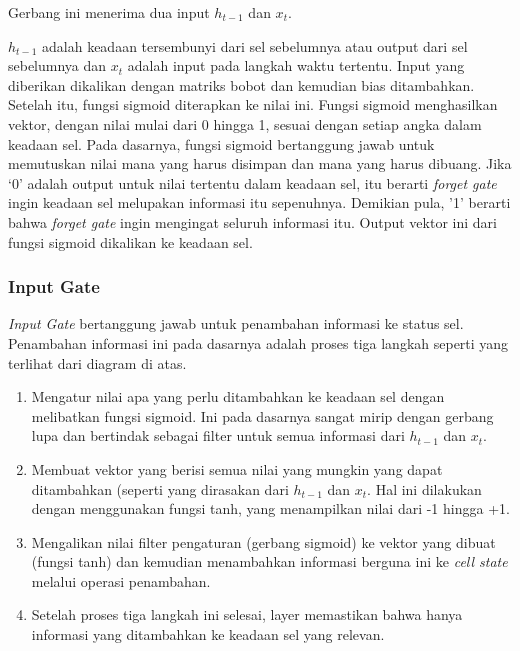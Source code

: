 \documentclass[./skripsi.tex]{subfiles}
\begin{document}
\par Gerbang ini menerima dua input $h_{t-1}$ dan $x_t$.
\par $h_{t-1}$ adalah keadaan tersembunyi dari sel sebelumnya atau output dari sel sebelumnya dan $x_t$ adalah input pada langkah waktu tertentu. Input yang diberikan dikalikan dengan matriks bobot dan kemudian bias ditambahkan. Setelah itu, fungsi sigmoid diterapkan ke nilai ini. Fungsi sigmoid menghasilkan vektor, dengan nilai mulai dari 0 hingga 1, sesuai dengan setiap angka dalam keadaan sel. Pada dasarnya, fungsi sigmoid bertanggung jawab untuk memutuskan nilai mana yang harus disimpan dan mana yang harus dibuang. Jika ‘0’ adalah output untuk nilai tertentu dalam keadaan sel, itu berarti \textit{forget gate} ingin keadaan sel melupakan informasi itu sepenuhnya. Demikian pula, '1' berarti bahwa \textit{forget gate} ingin mengingat seluruh informasi itu. Output vektor ini dari fungsi sigmoid dikalikan ke keadaan sel.

\subsubsection{Input Gate}
\par \textit{Input Gate} bertanggung jawab untuk penambahan informasi ke status sel. Penambahan informasi ini pada dasarnya adalah proses tiga langkah seperti yang terlihat dari diagram di atas.
\begin{center}
\end{center}

\begin{enumerate}
    \item Mengatur nilai apa yang perlu ditambahkan ke keadaan sel dengan melibatkan fungsi sigmoid. Ini pada dasarnya sangat mirip dengan gerbang lupa dan bertindak sebagai filter untuk semua informasi dari $h_{t-1}$ dan $x_{t}$.
    \item Membuat vektor yang berisi semua nilai yang mungkin yang dapat ditambahkan (seperti yang dirasakan dari $h_{t-1}$ dan $x_t$. Hal ini dilakukan dengan menggunakan fungsi tanh, yang menampilkan nilai dari -1 hingga +1.
    \item Mengalikan nilai filter pengaturan (gerbang sigmoid) ke vektor yang dibuat (fungsi tanh) dan kemudian menambahkan informasi berguna ini ke \textit{cell state} melalui operasi penambahan.
    \item Setelah proses tiga langkah ini selesai, layer memastikan bahwa hanya informasi yang ditambahkan ke keadaan sel yang relevan.
\end{enumerate}
\end{document}
